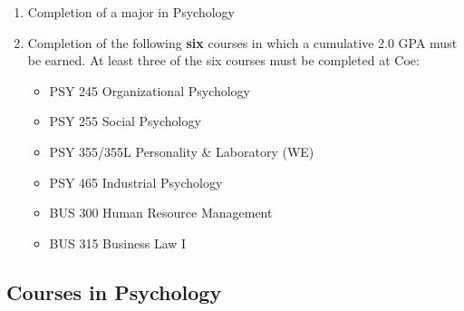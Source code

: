 \documentclass[
  letterpaper,
]{scrbook}
\providecommand{\tightlist}{%
  \setlength{\itemsep}{0pt}\setlength{\parskip}{0pt}}
\begin{document}
\begin{enumerate}
\def\labelenumi{\arabic{enumi}.}
\tightlist
\item
  Completion of a major in Psychology
\item
  Completion of the following \textbf{six} courses in which a cumulative
  2.0 GPA must be earned. At least three of the six courses must be
  completed at Coe:

  \begin{itemize}
  \tightlist
  \item
    PSY 245 Organizational Psychology\\
  \item
    PSY 255 Social Psychology\\
  \item
    PSY 355/355L Personality \& Laboratory (WE)\\
  \item
    PSY 465 Industrial Psychology\\
  \item
    BUS 300 Human Resource Management\\
  \item
    BUS 315 Business Law I
  \end{itemize}
\end{enumerate}

\subsection{Courses in Psychology}\label{courses-in-psychology}
\end{document}
